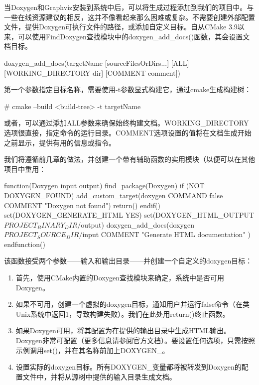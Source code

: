 当Doxygen和Graphviz安装到系统中后，可以将生成过程添加到我们的项目中。与一些在线资源建议的相反，这并不像看起来那么困难或复杂。不需要创建外部配置文件，提供Doxygen可执行文件的路径，或添加自定义目标。自从CMake 3.9以来，可以使用FindDoxygen查找模块中的doxygen\_add\_docs()函数，其会设置文档目标。

\begin{shell}
doxygen_add_docs(targetName [sourceFilesOrDirs...]
  [ALL] [WORKING_DIRECTORY dir] [COMMENT comment])
\end{shell}

第一个参数指定目标名称，需要使用-t参数显式构建它，通过cmake生成构建树：

\begin{shell}
# cmake --build <build-tree> -t targetName
\end{shell}

或者，可以通过添加ALL参数来确保始终构建文档。WORKING\_DIRECTORY选项很直接，指定命令的运行目录。COMMENT选项设置的值将在文档生成开始之前显示，提供有用的信息或指令。

我们将遵循前几章的做法，并创建一个带有辅助函数的实用模块（以便可以在其他项目中重用：


\begin{cmake}
function(Doxygen input output)
    find_package(Doxygen)
    if (NOT DOXYGEN_FOUND)
        add_custom_target(doxygen COMMAND false
            COMMENT "Doxygen not found")
        return()
    endif()
    set(DOXYGEN_GENERATE_HTML YES)
    set(DOXYGEN_HTML_OUTPUT
        ${PROJECT_BINARY_DIR}/${output})
    doxygen_add_docs(doxygen
        ${PROJECT_SOURCE_DIR}/${input}
        COMMENT "Generate HTML documentation"
    )
endfunction()
\end{cmake}

该函数接受两个参数——输入和输出目录——并创建一个自定义的doxygen目标：

\begin{enumerate}
\item
首先，使用CMake内置的Doxygen查找模块来确定，系统中是否可用Doxygen。

\item
如果不可用，创建一个虚拟的doxygen目标，通知用户并运行false命令（在类Unix系统中返回1，导致构建失败）。我们在此处用return()终止函数。

\item
如果Doxygen可用，将其配置为在提供的输出目录中生成HTML输出。Doxygen非常可配置（更多信息请参阅官方文档）。要设置任何选项，只需按照示例调用set()，并在其名称前加上DOXYGEN\_。

\item
设置实际的doxygen目标。所有DOXYGEN\_变量都将被转发到Doxygen的配置文件中，并将从源树中提供的输入目录生成文档。
\end{enumerate}

